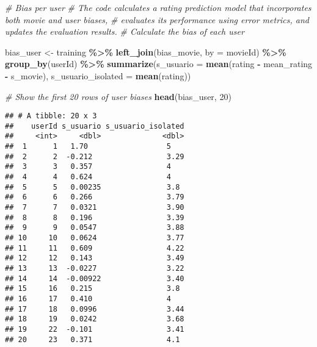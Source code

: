\documentclass[
]{article}
\newenvironment{Shaded}{\begin{snugshade}}{\end{snugshade}}
\newcommand{\AttributeTok}[1]{\textcolor[rgb]{0.13,0.29,0.53}{#1}}
\newcommand{\CommentTok}[1]{\textcolor[rgb]{0.56,0.35,0.01}{\textit{#1}}}
\newcommand{\DecValTok}[1]{\textcolor[rgb]{0.00,0.00,0.81}{#1}}
\newcommand{\FunctionTok}[1]{\textcolor[rgb]{0.13,0.29,0.53}{\textbf{#1}}}
\newcommand{\NormalTok}[1]{#1}
\newcommand{\OtherTok}[1]{\textcolor[rgb]{0.56,0.35,0.01}{#1}}
\newcommand{\SpecialCharTok}[1]{\textcolor[rgb]{0.81,0.36,0.00}{\textbf{#1}}}
\newcommand{\StringTok}[1]{\textcolor[rgb]{0.31,0.60,0.02}{#1}}
\begin{document}
\begin{Shaded}
\begin{Highlighting}[]
\CommentTok{\# Bias per user}
\CommentTok{\# The code calculates a rating prediction model that incorporates both movie and user biases, }
\CommentTok{\# evaluates its performance using error metrics, and updates the evaluation results.}
\CommentTok{\# Calculate the bias of each user}

\NormalTok{bias\_user }\OtherTok{\textless{}{-}}\NormalTok{ training }\SpecialCharTok{\%\textgreater{}\%}
  \FunctionTok{left\_join}\NormalTok{(bias\_movie, }\AttributeTok{by =} \StringTok{\textquotesingle{}movieId\textquotesingle{}}\NormalTok{) }\SpecialCharTok{\%\textgreater{}\%}
  \FunctionTok{group\_by}\NormalTok{(userId) }\SpecialCharTok{\%\textgreater{}\%}
  \FunctionTok{summarize}\NormalTok{(}\AttributeTok{s\_usuario =} \FunctionTok{mean}\NormalTok{(rating }\SpecialCharTok{{-}}\NormalTok{ mean\_rating }\SpecialCharTok{{-}}\NormalTok{ s\_movie),}
            \AttributeTok{s\_usuario\_isolated =} \FunctionTok{mean}\NormalTok{(rating))}

\CommentTok{\# Show the first 20 rows of user biases}
\FunctionTok{head}\NormalTok{(bias\_user, }\DecValTok{20}\NormalTok{)}
\end{Highlighting}
\end{Shaded}

\begin{verbatim}
## # A tibble: 20 x 3
##    userId s_usuario s_usuario_isolated
##     <int>     <dbl>              <dbl>
##  1      1   1.70                  5   
##  2      2  -0.212                 3.29
##  3      3   0.357                 4   
##  4      4   0.624                 4   
##  5      5   0.00235               3.8 
##  6      6   0.266                 3.79
##  7      7   0.0321                3.90
##  8      8   0.196                 3.39
##  9      9   0.0547                3.88
## 10     10   0.0624                3.77
## 11     11   0.609                 4.22
## 12     12   0.143                 3.49
## 13     13  -0.0227                3.22
## 14     14  -0.00922               3.40
## 15     16   0.215                 3.8 
## 16     17   0.410                 4   
## 17     18   0.0996                3.44
## 18     19   0.0242                3.68
## 19     22  -0.101                 3.41
## 20     23   0.371                 4.1
\end{verbatim}
\end{document}
